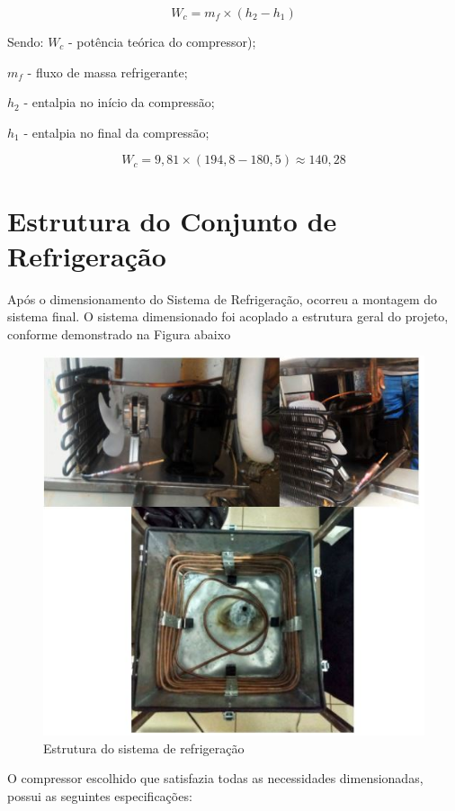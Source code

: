 	 \begin{equation}
	 W_c = m_f \times (h_2 - h_1)
	 \end{equation}
	 
	 Sendo:
	$ W_c$ -  potência teórica do compressor); 
	
	 $m_f$ - fluxo de massa refrigerante;
	 
	 $h_2$ -  entalpia no início da compressão;
	 
	 $h_1$ - entalpia no final da compressão;
	 
	 $$
	 W_c = 9,81 \times (194,8 - 180,5) \approx 140,28
	 $$
	 
	 \section{Estrutura do Conjunto de Refrigeração}
	 Após o dimensionamento do Sistema de Refrigeração, ocorreu a montagem do sistema final. O sistema dimensionado foi acoplado a estrutura geral do projeto, conforme demonstrado na Figura abaixo
	 	\begin{figure}[H]
	 		\begin{center}
	 			\includegraphics[scale =1]{figuras/Estrutura_refrigeracao}
	 			\caption{Estrutura do sistema de refrigeração }
	 		\end{center}
	 	\end{figure}
	 O compressor escolhido que satisfazia todas as necessidades dimensionadas, possui as seguintes especificações:
	 
